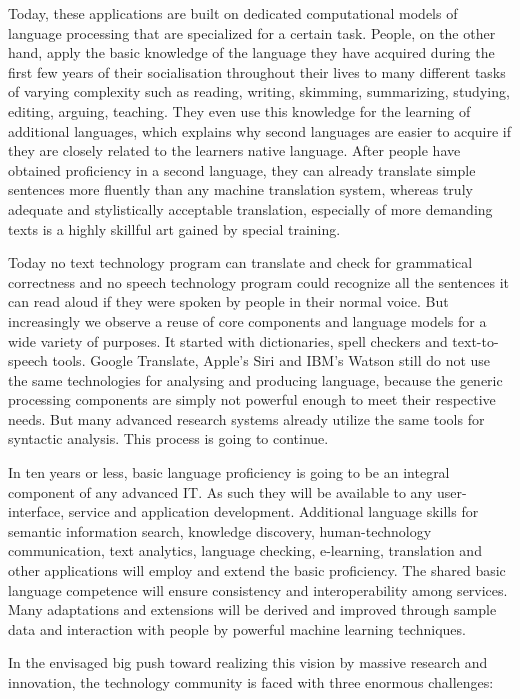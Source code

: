 \begin{multicols}{2}
Today, these applications are built on dedicated computational models of language processing that are specialized for a certain task. People, on the other hand, apply the basic knowledge of the language they have acquired during the first few years of their socialisation throughout their lives to many different tasks of varying complexity such as reading, writing, skimming, summarizing, studying, editing, arguing, teaching. They even use this knowledge for the learning of additional languages, which explains why second languages are easier to acquire if they are closely related to the learners native language. After people have obtained proficiency in a second language, they can already translate simple sentences more fluently than any machine translation system, whereas truly adequate and stylistically acceptable translation, especially of more demanding texts is a highly skillful art gained by special training. 

Today no text technology program can translate and check for grammatical correctness and no speech technology program could recognize all the sentences it can read aloud if they were spoken by people in their normal voice. But increasingly we observe a reuse of core components and language models for a wide variety of purposes. It started with dictionaries, spell checkers and text-to-speech tools. Google Translate, Apple’s Siri and IBM’s Watson still do not use the same technologies for analysing and producing language, because the generic processing components are simply not powerful enough to meet their respective needs. But many advanced research systems already utilize the same tools for syntactic analysis. This process is going to continue.

In ten years or less, basic language proficiency is going to be an integral component of any advanced IT. As such they will be available to any user-interface, service and application development. Additional language skills for semantic information search, knowledge discovery, human-technology communication, text analytics, language checking, e-learning, translation and other applications will employ and extend the basic proficiency. The shared basic language competence will ensure consistency and interoperability among services.  Many adaptations and extensions will be derived and improved through sample data and interaction with people by powerful machine learning techniques.

In the envisaged big push toward realizing this vision by massive research and innovation, the technology community is faced with three enormous challenges:


\end{multicols}
